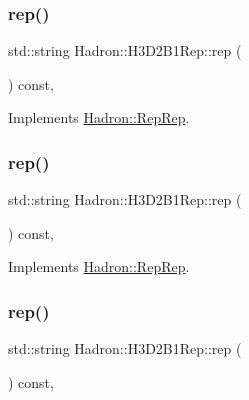 \subsubsection{\texorpdfstring{rep()}{rep()}\hspace{0.1cm}{\footnotesize\ttfamily [2/5]}}
{\footnotesize\ttfamily std\+::string Hadron\+::\+H3\+D2\+B1\+Rep\+::rep (\begin{DoxyParamCaption}{ }\end{DoxyParamCaption}) const\hspace{0.3cm}{\ttfamily [inline]}, {\ttfamily [virtual]}}



Implements \mbox{\hyperlink{structHadron_1_1RepRep_ab3213025f6de249f7095892109575fde}{Hadron\+::\+Rep\+Rep}}.

\mbox{\label{structHadron_1_1H3D2B1Rep_a43cf9c155f37ec6e0fa26166cd1a5f2a}} 
\subsubsection{\texorpdfstring{rep()}{rep()}\hspace{0.1cm}{\footnotesize\ttfamily [3/5]}}
{\footnotesize\ttfamily std\+::string Hadron\+::\+H3\+D2\+B1\+Rep\+::rep (\begin{DoxyParamCaption}{ }\end{DoxyParamCaption}) const\hspace{0.3cm}{\ttfamily [inline]}, {\ttfamily [virtual]}}



Implements \mbox{\hyperlink{structHadron_1_1RepRep_ab3213025f6de249f7095892109575fde}{Hadron\+::\+Rep\+Rep}}.

\mbox{\label{structHadron_1_1H3D2B1Rep_a43cf9c155f37ec6e0fa26166cd1a5f2a}} 
\subsubsection{\texorpdfstring{rep()}{rep()}\hspace{0.1cm}{\footnotesize\ttfamily [4/5]}}
{\footnotesize\ttfamily std\+::string Hadron\+::\+H3\+D2\+B1\+Rep\+::rep (\begin{DoxyParamCaption}{ }\end{DoxyParamCaption}) const\hspace{0.3cm}{\ttfamily [inline]}, {\ttfamily [virtual]}}




